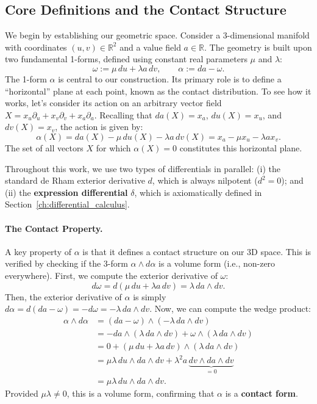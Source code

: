 \subsection{Core Definitions and the Contact Structure}\label{subsec:core_definitions}

We begin by establishing our geometric space. Consider a 3-dimensional manifold with coordinates $(u,v) \in \mathbb{R}^2$ and a value field $a \in \mathbb{R}$. The geometry is built upon two fundamental 1-forms, defined using constant real parameters $\mu$ and $\lambda$:
\begin{equation}\label{eq:contact_forms_def}
\omega := \mu\,du + \lambda a\,dv, \qquad \alpha := da - \omega.
\end{equation}
The 1-form $\alpha$ is central to our construction. Its primary role is to define a ``horizontal'' plane at each point, known as the contact distribution. To see how it works, let's consider its action on an arbitrary vector field $X = x_u \partial_u + x_v \partial_v + x_a \partial_a$. Recalling that $da(X) = x_a$, $du(X) = x_u$, and $dv(X) = x_v$, the action is given by:
\[
\alpha(X) = da(X) - \mu\,du(X) - \lambda a\,dv(X) = x_a - \mu x_u - \lambda a x_v.
\]
The set of all vectors $X$ for which $\alpha(X)=0$ constitutes this horizontal plane.

Throughout this work, we use two types of differentials in parallel: (i) the standard de Rham exterior derivative $d$, which is always nilpotent ($d^2=0$); and (ii) the \textbf{expression differential} $\delta$, which is axiomatically defined in Section~\ref{ch:differential_calculus}.

\paragraph{The Contact Property.}
A key property of $\alpha$ is that it defines a contact structure on our 3D space. This is verified by checking if the 3-form $\alpha \wedge d\alpha$ is a volume form (i.e., non-zero everywhere). First, we compute the exterior derivative of $\omega$:
\[
d\omega = d(\mu\,du + \lambda a\,dv) = \lambda\,da \wedge dv.
\]
Then, the exterior derivative of $\alpha$ is simply $d\alpha = d(da - \omega) = -d\omega = -\lambda\,da \wedge dv$. Now, we can compute the wedge product:
\begin{align*}
\alpha \wedge d\alpha &= (da - \omega) \wedge (-\lambda\,da \wedge dv) \\
&= -da \wedge (\lambda\,da \wedge dv) + \omega \wedge (\lambda\,da \wedge dv) \\
&= 0 + (\mu\,du + \lambda a\,dv) \wedge (\lambda\,da \wedge dv) \\
&= \mu\lambda\,du \wedge da \wedge dv + \lambda^2 a\,\underbrace{dv \wedge da \wedge dv}_{=0} \\
&= \mu\lambda\,du \wedge da \wedge dv.
\end{align*}
Provided $\mu\lambda \neq 0$, this is a volume form, confirming that $\alpha$ is a \textbf{contact form}.

